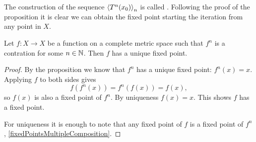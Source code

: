 The construction of the sequence $\left\langle T^n(x_0) \right\rangle_n$ is called . Following the proof of the proposition it is clear we can obtain the fixed point starting the iteration from any point in $X$.

\begin{corollary}
Let $f: X\to X$ be a function on a complete metric space such that $f^n$ is a contration for some $n\in \mathbb{N}$. Then $f$ has a unique fixed point.
\end{corollary}
\begin{proof}
By the proposition we know that $f^n$ has a unique fixed point: $f^n(x) = x$. Applying $f$ to both sides gives
\[ f(f^n(x)) = f^n(f(x)) = f(x), \]
so $f(x)$ is also a fixed point of $f^n$. By uniqueness $f(x) = x$. This shows $f$ has a fixed point.

For uniqueness it is enough to note that any fixed point of $f$ is a fixed point of $f^n$, \ref{fixedPointsMultipleComposition}.
\end{proof}


